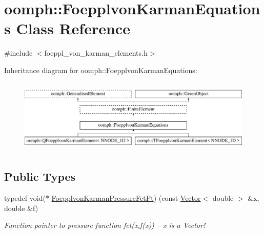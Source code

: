\hypertarget{classoomph_1_1FoepplvonKarmanEquations}{}\section{oomph\+:\+:Foepplvon\+Karman\+Equations Class Reference}
\label{classoomph_1_1FoepplvonKarmanEquations}


{\ttfamily \#include $<$foeppl\+\_\+von\+\_\+karman\+\_\+elements.\+h$>$}

Inheritance diagram for oomph\+:\+:Foepplvon\+Karman\+Equations\+:\begin{figure}[H]
\begin{center}
\leavevmode
\includegraphics[height=3.589744cm]{classoomph_1_1FoepplvonKarmanEquations}
\end{center}
\end{figure}
\subsection*{Public Types}
\begin{DoxyCompactItemize}
\item 
typedef void($\ast$ \hyperlink{classoomph_1_1FoepplvonKarmanEquations_a39b64f9712ec34f455beb9f4271ff297}{Foepplvon\+Karman\+Pressure\+Fct\+Pt}) (const \hyperlink{classoomph_1_1Vector}{Vector}$<$ double $>$ \&x, double \&f)
\begin{DoxyCompactList}\small\item\em Function pointer to pressure function fct(x,f(x)) -- x is a Vector! \end{DoxyCompactList}\end{DoxyCompactItemize}
